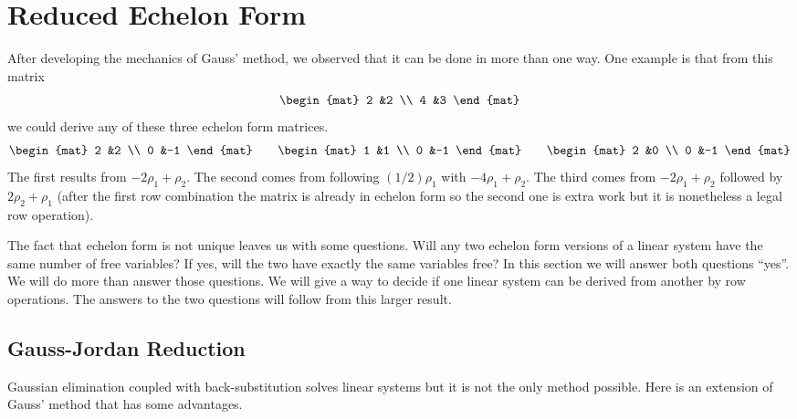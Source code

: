 \section{Reduced Echelon Form}
After developing the mechanics of Gauss' method, 
we observed that it can be done in more than one way.
One example is that from this matrix 
\begin{equation*}
    \begin{mat}
       2  &2  \\
       4  &3
    \end{mat}
\end{equation*}
we could derive any of these three echelon form matrices.
\begin{equation*}
    \begin{mat}
       2  &2  \\
       0  &-1
    \end{mat}
    \qquad
    \begin{mat}
       1  &1  \\
       0  &-1
    \end{mat}
    \qquad
    \begin{mat}
       2  &0  \\
       0  &-1
    \end{mat}
\end{equation*}
The first results from $-2\rho_1+\rho_2$.
The second comes from following $(1/2)\rho_1$ with $-4\rho_1+\rho_2$.
The third comes
from $-2\rho_1+\rho_2$ followed by $2\rho_2+\rho_1$
(after the first row combination the matrix is already in
echelon form so the second one is extra work 
but it is nonetheless a legal row operation).

The fact that echelon form 
is not unique leaves us with some questions.
Will any two echelon form versions of a linear system have the same number of
free variables?
If yes, 
will the two have exactly the same variables free?
In this section we will answer both questions ``yes''.
We will do more than answer those questions.
We will give a way to decide if one linear system 
can be derived from another by row operations.
The answers to the two questions will follow from this larger result.








\subsection{Gauss-Jordan Reduction}%
Gaussian elimination coupled with back-substitution
solves linear systems but it is not the only method possible.
Here is an extension of Gauss' method that has some advantages.

